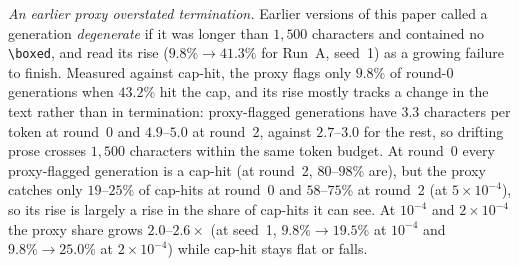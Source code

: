 \documentclass[runningheads]{llncs}
\begin{document}
\emph{An earlier proxy overstated termination.} Earlier versions of this paper
called a generation \emph{degenerate} if it was longer than $1{,}500$ characters
and contained no \verb|\boxed|, and read its rise ($9.8\%\to41.3\%$ for Run~A,
seed~1) as a growing failure to finish. Measured against cap-hit, the proxy
flags only $9.8\%$ of round-0 generations when $43.2\%$ hit the cap, and its rise
mostly tracks a change in the text rather than in termination: proxy-flagged
generations have $3.3$ characters per token at round~0 and $4.9$--$5.0$ at
round~2, against $2.7$--$3.0$ for the rest, so drifting prose crosses
$1{,}500$ characters within the same token budget. At round~0 every
proxy-flagged generation is a cap-hit (at round~2, $80$--$98\%$ are), but the
proxy catches only $19$--$25\%$ of cap-hits at round~0 and $58$--$75\%$ at
round~2 (at $5\times10^{-4}$), so its rise is largely a rise in the share of
cap-hits it can see. At $10^{-4}$ and $2\times10^{-4}$ the proxy share grows
$2.0$--$2.6\times$ (at seed~1, $9.8\%\to19.5\%$ at $10^{-4}$ and
$9.8\%\to25.0\%$ at $2\times10^{-4}$) while cap-hit stays flat or falls.
\end{document}

